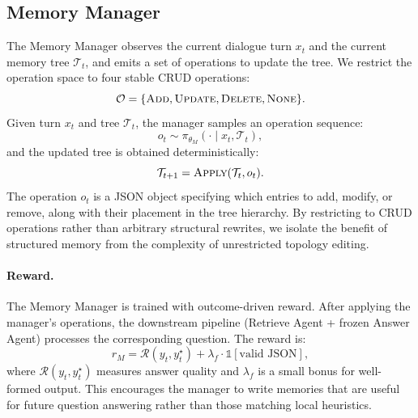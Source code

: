 \subsection{Memory Manager}
The Memory Manager observes the current dialogue turn $x_t$ and the current memory tree $\mathcal{T}_t$, and emits a set of operations to update the tree. We restrict the operation space to four stable CRUD operations:
\begin{equation}
\mathcal{O} = \{\textsc{Add}, \textsc{Update}, \textsc{Delete}, \textsc{None}\}.
\end{equation}
Given turn $x_t$ and tree $\mathcal{T}_t$, the manager samples an operation sequence:
\begin{equation}
o_t \sim \pi_{\theta_M}(\cdot \mid x_t, \mathcal{T}_t),
\end{equation}
and the updated tree is obtained deterministically:
\begin{equation}
\mathcal{T}_{t+1} = \textsc{Apply}(\mathcal{T}_t, o_t).
\end{equation}
The operation $o_t$ is a JSON object specifying which entries to add, modify, or remove, along with their placement in the tree hierarchy. By restricting to CRUD operations rather than arbitrary structural rewrites, we isolate the benefit of structured memory from the complexity of unrestricted topology editing.

\paragraph{Reward.}
The Memory Manager is trained with outcome-driven reward. After applying the manager's operations, the downstream pipeline (Retrieve Agent + frozen Answer Agent) processes the corresponding question. The reward is:
\begin{equation}
r_M = \mathcal{R}(y_t, y_t^\star) + \lambda_f \cdot \mathbb{1}[\text{valid JSON}],
\end{equation}
where $\mathcal{R}(y_t, y_t^\star)$ measures answer quality and $\lambda_f$ is a small bonus for well-formed output. This encourages the manager to write memories that are useful for future question answering rather than those matching local heuristics.

